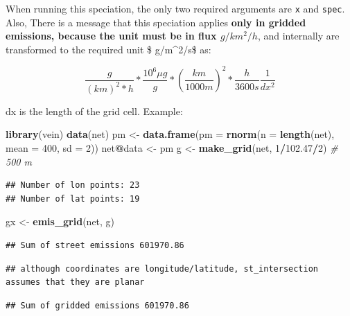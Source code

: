 \documentclass[12pt,graybox,envcountchap,sectrefs]{krantz}
\makeatletter
\newenvironment{Shaded}{\begin{snugshade}}{\end{snugshade}}
\newcommand{\KeywordTok}[1]{\textcolor[rgb]{0.13,0.29,0.53}{\textbf{#1}}}
\newcommand{\DataTypeTok}[1]{\textcolor[rgb]{0.13,0.29,0.53}{#1}}
\newcommand{\DecValTok}[1]{\textcolor[rgb]{0.00,0.00,0.81}{#1}}
\newcommand{\FloatTok}[1]{\textcolor[rgb]{0.00,0.00,0.81}{#1}}
\newcommand{\StringTok}[1]{\textcolor[rgb]{0.31,0.60,0.02}{#1}}
\newcommand{\CommentTok}[1]{\textcolor[rgb]{0.56,0.35,0.01}{\textit{#1}}}
\newcommand{\OperatorTok}[1]{\textcolor[rgb]{0.81,0.36,0.00}{\textbf{#1}}}
\newcommand{\NormalTok}[1]{#1}
\newenvironment{kframe}{%
\medskip{}
\setlength{\fboxsep}{.8em}
 \def\at@end@of@kframe{}%
 \ifinner\ifhmode%
  \def\at@end@of@kframe{\end{minipage}}%
  \begin{minipage}{\columnwidth}%
 \fi\fi%
 \def\FrameCommand##1{\hskip\@totalleftmargin \hskip-\fboxsep
 \colorbox{shadecolor}{##1}\hskip-\fboxsep
     \hskip-\linewidth \hskip-\@totalleftmargin \hskip\columnwidth}%
 \MakeFramed {\advance\hsize-\width
   \@totalleftmargin\z@ \linewidth\hsize
   \@setminipage}}%
 {\par\unskip\endMakeFramed%
 \at@end@of@kframe}
\renewenvironment{Shaded}{\begin{kframe}}{\end{kframe}}
\theoremstyle{definition}
\theoremstyle{definition}
\theoremstyle{definition}
\theoremstyle{remark}
\makeatother
\begin{document}
When running this speciation, the only two required arguments are
\texttt{x} and \texttt{spec}. Also, There is a message that this
speciation applies \textbf{only in gridded emissions, because the unit
must be in flux \(g/km^2/h\)}, and internally are transformed to the
required unit \$ \mu g/m\^{}2/s\$ as:

\[ \frac{g}{(km)^2*h}*\frac{10^6 \mu g}{g}*(\frac{km}{1000m})^2*\frac{h}{3600s}\frac{1}{dx^2}\]

dx is the length of the grid cell. Example:

\begin{Shaded}
\begin{Highlighting}[]
\KeywordTok{library}\NormalTok{(vein)}
\KeywordTok{data}\NormalTok{(net)}
\NormalTok{pm <-}\StringTok{ }\KeywordTok{data.frame}\NormalTok{(}\DataTypeTok{pm =} \KeywordTok{rnorm}\NormalTok{(}\DataTypeTok{n =} \KeywordTok{length}\NormalTok{(net), }\DataTypeTok{mean =} \DecValTok{400}\NormalTok{, }\DataTypeTok{sd =} \DecValTok{2}\NormalTok{))}
\NormalTok{net}\OperatorTok{@}\NormalTok{data <-}\StringTok{ }\NormalTok{pm}
\NormalTok{g <-}\StringTok{ }\KeywordTok{make_grid}\NormalTok{(net, }\DecValTok{1}\OperatorTok{/}\FloatTok{102.47}\OperatorTok{/}\DecValTok{2}\NormalTok{) }\CommentTok{# 500 m}
\end{Highlighting}
\end{Shaded}

\begin{verbatim}
## Number of lon points: 23
## Number of lat points: 19
\end{verbatim}

\begin{Shaded}
\begin{Highlighting}[]
\NormalTok{gx <-}\StringTok{ }\KeywordTok{emis_grid}\NormalTok{(net, g)}
\end{Highlighting}
\end{Shaded}

\begin{verbatim}
## Sum of street emissions 601970.86
\end{verbatim}

\begin{verbatim}
## although coordinates are longitude/latitude, st_intersection assumes that they are planar
\end{verbatim}

\begin{verbatim}
## Sum of gridded emissions 601970.86
\end{verbatim}
\end{document}
